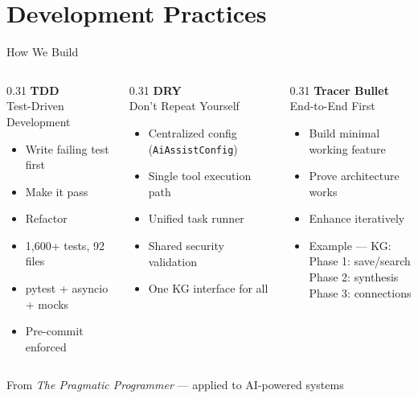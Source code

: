 \documentclass[aspectratio=169,10pt]{beamer}
\begin{document}
\section{Development Practices}

\begin{frame}{How We Build}
\begin{columns}[T]
\begin{column}{0.31\textwidth}
\textbf{\color{rhred}TDD}\\
\small Test-Driven Development
\begin{itemize}\scriptsize
  \item Write failing test first
  \item Make it pass
  \item Refactor
  \item 1,600+ tests, 92 files
  \item pytest + asyncio + mocks
  \item Pre-commit enforced
\end{itemize}
\end{column}
\begin{column}{0.31\textwidth}
\textbf{\color{rhblue}DRY}\\
\small Don't Repeat Yourself
\begin{itemize}\scriptsize
  \item Centralized config (\texttt{AiAssistConfig})
  \item Single tool execution path
  \item Unified task runner
  \item Shared security validation
  \item One KG interface for all
\end{itemize}
\end{column}
\begin{column}{0.31\textwidth}
\textbf{\color{rhgreen}Tracer Bullet}\\
\small End-to-End First
\begin{itemize}\scriptsize
  \item Build minimal working feature
  \item Prove architecture works
  \item Enhance iteratively
  \item Example --- KG:\\
    Phase 1: save/search\\
    Phase 2: synthesis\\
    Phase 3: connections
\end{itemize}
\end{column}
\end{columns}

\vfill
\centering
\small\color{gray} From \textit{The Pragmatic Programmer} --- applied to AI-powered systems
\end{frame}
\end{document}
